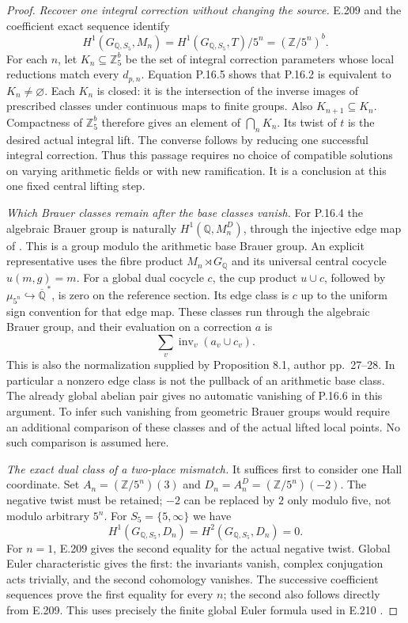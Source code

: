 \begin{proof}
\emph{Recover one integral correction without changing the source.}
E.209 and the coefficient exact sequence identify
\[
 H^1(G_{\mathbb Q,S_5},M_n)
   =H^1(G_{\mathbb Q,S_5},T)/5^n
   =(\mathbb Z/5^n)^b .
 \tag{P.16.5}
\]
For each $n$, let $K_n\subseteq\mathbb Z_5^b$ be the set
of integral correction parameters whose local reductions
match every $d_{p,n}$. Equation P.16.5 shows that P.16.2 is
equivalent to $K_n\ne\varnothing$. Each $K_n$ is closed:
it is the intersection of the inverse images of prescribed
classes under continuous maps to finite groups.
Also $K_{n+1}\subseteq K_n$. Compactness of $\mathbb Z_5^b$
therefore gives an element of $\bigcap_nK_n$.
Its twist of $t$ is the desired actual integral lift.
The converse follows by reducing one successful integral
correction. Thus this passage requires no choice of compatible
solutions on varying arithmetic fields or with new ramification.
It is a conclusion at this one fixed central lifting step.

\emph{Which Brauer classes remain after the base classes vanish.}
For P.16.4 the algebraic Brauer group is naturally
$H^1(\mathbb Q,M_n^D)$, through the injective edge map of
\citep[Lemma 2.2 and Definition 2.3, author pp.~5--6]{LitPalSchlank2022}.
This is a group modulo the arithmetic base Brauer group.
An explicit representative uses the fibre product
$M_n\rtimes G_{\mathbb Q}$ and its universal central cocycle
$u(m,g)=m$. For a global dual cocycle $c$, the cup product
$u\cup c$, followed by $\mu_{5^n}\hookrightarrow\overline{\mathbb Q}^{\,*}$,
is zero on the reference section. Its edge class is $c$
up to the uniform sign convention for that edge map.
These classes run through the algebraic Brauer group, and
their evaluation on a correction $a$ is
\[
          \sum_v\operatorname{inv}_v(a_v\cup c_v).
 \tag{P.16.6}
\]
This is also the normalization supplied by Proposition 8.1,
author pp.~27--28. In particular a nonzero edge class is
not the pullback of an arithmetic base class. The already
global abelian pair gives no automatic vanishing of P.16.6
in this argument. To infer such vanishing from geometric
Brauer groups would require an additional comparison of
these classes and of the actual lifted local points.
No such comparison is assumed here.

\emph{The exact dual class of a two-place mismatch.}
It suffices first to consider one Hall coordinate. Set
$A_n=(\mathbb Z/5^n)(3)$ and $D_n=A_n^D=(\mathbb Z/5^n)(-2)$.
The negative twist must be retained; $-2$ can be replaced by
$2$ only modulo five, not modulo arbitrary $5^n$.
For $S_5=\{5,\infty\}$ we have
\[
 H^1(G_{\mathbb Q,S_5},D_n)
       =H^2(G_{\mathbb Q,S_5},D_n)=0 .
 \tag{P.16.7}
\]
For $n=1$, E.209 gives the second equality for the actual
negative twist. Global Euler characteristic gives the first:
the invariants vanish, complex conjugation acts trivially,
and the second cohomology vanishes. The successive coefficient
sequences prove the first equality for every $n$; the second
also follows directly from E.209. This uses precisely the
finite global Euler formula used in E.210
\citep[I.5.1, p.~67]{CohMilneADT}.


\end{proof}

